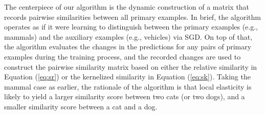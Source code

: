 The centerpiece of our algorithm is the dynamic construction of a matrix that records pairwise similarities between all primary examples. In brief, the algorithm operates as if it were learning to distinguish between the primary examples (e.g., mammals) and the auxiliary examples (e.g., vehicles) via SGD. On top of that, the algorithm evaluates the changes in the predictions for any pairs of primary examples during the training process, and the recorded changes are used to construct the pairwise similarity matrix based on either the relative similarity in Equation (\ref{eq:sr}) or the kernelized similarity in Equation (\ref{eq:sk}). Taking the mammal case as earlier, the rationale of the algorithm is that local elasticity is likely to yield a larger similarity score between two cats (or two dogs), and a smaller similarity score between a cat and a dog.


